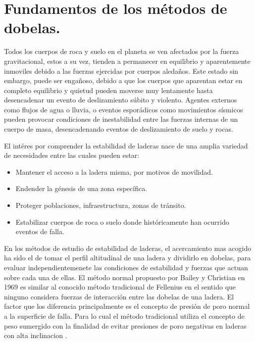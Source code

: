 \chapter{Fundamentos de los m\'etodos de dobelas.}

Todos los cuerpos de roca y suelo en el planeta se ven afectados por la fuerza gravitacional, estos a su vez, tienden a permanecer en equilibrio y aparentemente inmoviles debido a las fuerzas ejercidas por cuerpos aleda\~nos. Este estado sin embargo, puede ser enga\~noso, debido a que los cuerpos que aparentan estar en completo equilibrio y quietud pueden moverse muy lentamente hasta desencadenar un evento de deslizamiento s\'ubito y violento.
Agentes externos como flujos de agua o lluvia, o eventos espor\'adicos como movimientos s\'ismicos pueden provocar condiciones de inestabilidad entre las fuerzas internas de un cuerpo de masa, desencadenando eventos de deslizamiento de suelo y rocas.

El int\'eres por comprender la estabilidad de laderas nace de una amplia variedad de necesidades entre las cuales pueden estar:

\begin{itemize}
  \item Mantener el acceso a la ladera misma, por motivos de movilidad.
  \item Endender la g\'enesis de una zona espec\'ifica.
  \item Proteger poblaciones, infraestructura, zonas de tr\'ansito.
  \item Estabilizar cuerpos de roca o suelo donde hist\'oricamente han ocurrido eventos de falla.
\end{itemize}

En los m\'etodos de estudio de estabilidad de laderas, el acercamiento mas acogido ha sido el de tomar el  perfil altitudinal de una ladera y dividirlo en dobelas, para evaluar independientemenete las condiciones de estabilidad y fuerzas que actuan sobre cada una de ellas.
El m\'etodo normal propuesto por Bailey y Christian en 1969 \cite{bailey1969ices} es similar al conocido m\'etodo tradicional de Fellenius \cite{fellenius1936} en el sentido que ninguno considera fuerzas de interacci\'on entre las dobelas de una ladera.
El factor que los diferencia principalmente es el concepto de presi\'on de poro normal a la superficie de falla. Para lo cual el m\'etodo tradicional utiliza el concepto de peso sumergido con la finalidad de evitar presiones de poro negativas en laderas con alta inclinacion \cite{fredlund1977comparison}. 

